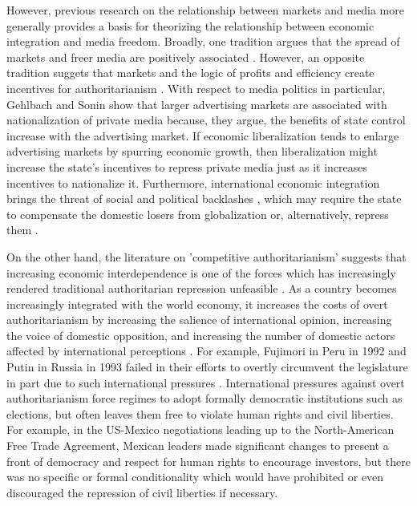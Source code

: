 \documentclass[a4paper]{article}\usepackage[]{graphicx}\usepackage[]{color}
\begin{document}
However, previous research on the relationship between markets and media more generally provides a basis for theorizing the relationship between economic integration and media freedom. Broadly, one tradition argues that the spread of markets and freer media are positively associated \parencites{Habermas:1991vg}{Islam:2002uc}{Islam:2003tu}. However, an opposite tradition suggets that markets and the logic of profits and efficiency create incentives for authoritarianism \parencite{Huntington:1975vt}. With respect to media politics in particular, Gehlbach and Sonin \parencite*{Gehlbach:2011ky} show that larger advertising markets are associated with nationalization of private media because, they argue, the benefits of state control increase with the advertising market. If economic liberalization tends to enlarge advertising markets by spurring economic growth, then liberalization might increase the state's incentives to repress private media just as it increases incentives to nationalize it. Furthermore, international economic integration brings the threat of social and political backlashes \parencite{Bussmann:2007vx}, which may require the state to compensate the domestic losers from globalization \parencite{Rodrik:1998te} or, alternatively, repress them \parencite{Adsera:2002vt}.

On the other hand, the literature on 'competitive authoritarianism' suggests that increasing economic interdependence is one of the forces which has increasingly rendered traditional authoritarian repression unfeasible \parencite[60, 62]{Levitsky:2002gx}. As a country becomes increasingly integrated with the world economy, it increases the costs of overt authoritarianism by increasing the salience of international opinion, increasing the voice of domestic opposition, and increasing the number of domestic actors affected by international perceptions \parencite{Levitsky:2006ex}. For example, Fujimori in Peru in 1992 and Putin in Russia in 1993 failed in their efforts to overtly circumvent the legislature in part due to such international pressures \parencite[56]{Levitsky:2002gx}. International pressures against overt authoritarianism force regimes to adopt formally democratic institutions such as elections, but often leaves them free to violate human rights and civil liberties. For example, in the US-Mexico negotiations leading up to the North-American Free Trade Agreement, Mexican leaders made significant changes to present a front of democracy and respect for human rights to encourage investors, but there was no specific or formal conditionality which would have prohibited or even discouraged the repression of civil liberties if necessary.
\end{document}

